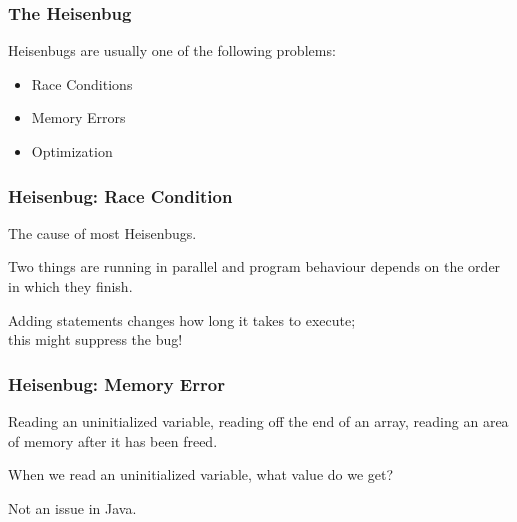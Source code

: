 \begin{frame}
\frametitle{The Heisenbug}
\begin{changemargin}{1cm}

Heisenbugs are usually one of the following problems:

\begin{itemize}
	\item Race Conditions
	\item Memory Errors
	\item Optimization
\end{itemize}

\end{changemargin}
\end{frame}

\begin{frame}
\frametitle{Heisenbug: Race Condition}
\begin{changemargin}{1cm}

The cause of most Heisenbugs.

Two things are running in parallel and program behaviour depends on the order in which they finish.

Adding statements changes how long it takes to execute; \\
\quad this might suppress the bug!

\end{changemargin}
\end{frame}

\begin{frame}
\frametitle{Heisenbug: Memory Error}
\begin{changemargin}{1cm}

Reading an uninitialized variable, reading off the end of an array, reading an area of memory after it has been freed.

When we read an uninitialized variable, what value do we get?


Not an issue in Java. 

\end{changemargin}
\end{frame}

